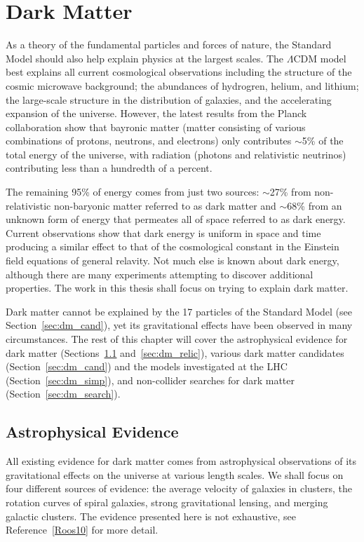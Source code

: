 \chapter{Dark Matter}
\label{sec:dm}

As a theory of the fundamental particles and forces of nature, the Standard Model should also help explain physics at the largest scales.
The $\Lambda$CDM model best explains all current cosmological observations including the structure of the cosmic microwave background; the abundances of hydrogren, helium, and lithium; the large-scale structure in the distribution of galaxies, and the accelerating expansion of the universe.
However, the latest results from the Planck collaboration show that bayronic matter (matter consisting of various combinations of protons, neutrons, and electrons) only contributes $\sim$5\% of the total energy of the universe, with radiation (photons and relativistic neutrinos) contributing less than a hundredth of a percent.

The remaining 95\% of energy comes from just two sources: $\sim$27\% from non-relativistic non-baryonic matter referred to as dark matter and $\sim$68\% from an unknown form of energy that permeates all of space referred to as dark energy.
Current observations show that dark energy is uniform in space and time producing a similar effect to that of the cosmological constant in the Einstein field equations of general relavity.
Not much else is known about dark energy, although there are many experiments attempting to discover additional properties.
The work in this thesis shall focus on trying to explain dark matter.

Dark matter cannot be explained by the 17 particles of the Standard Model (see Section~\ref{sec:dm_cand}), yet its gravitational effects have been observed in many circumstances.
The rest of this chapter will cover the astrophysical evidence for dark matter (Sections~\ref{sec:dm_astro} and~\ref{sec:dm_relic}), various dark matter candidates (Section~\ref{sec:dm_cand}) and the models investigated at the LHC (Section~\ref{sec:dm_simp}), and non-collider searches for dark matter (Section~\ref{sec:dm_search}).

\section{Astrophysical Evidence}
\label{sec:dm_astro}

All existing evidence for dark matter comes from astrophysical observations of its gravitational effects on the universe at various length scales.
We shall focus on four different sources of evidence: the average velocity of galaxies in clusters, the rotation curves of spiral galaxies, strong gravitational lensing, and merging galactic clusters. The evidence presented here is not exhaustive, see Reference~\ref{Roos10} for more detail. %

